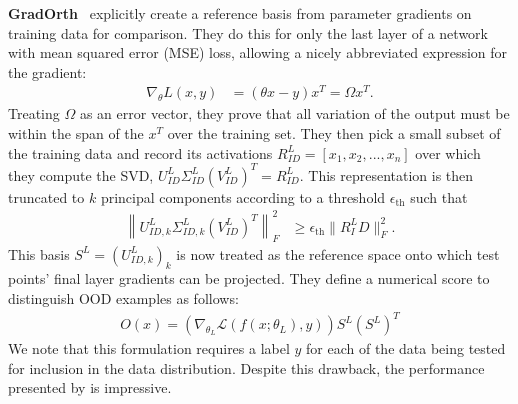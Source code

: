 \textbf{GradOrth}~\citet{behpour2023} explicitly create a reference basis from parameter gradients on training data for comparison. They do this for only the last layer of a network with mean squared error (MSE) loss, allowing a nicely abbreviated expression for the gradient:
\begin{align}
    \nabla_\theta L(x, y) &= (\theta x - y)x^T = \Omega x^T.
\end{align}
Treating $\Omega$ as an error vector, they prove that all variation of the output must be within the span of the $x^T$ over the training set. They then pick a small subset of the training data and record its activations $R^L_{ID} = [x_1, x_2, ..., x_n]$ over which they compute the SVD, $U^L_{ID} \Sigma^L_{ID} (V^L_{ID})^T = R^L_{ID}$. This representation is then truncated to $k$ principal components according to a threshold $\epsilon_{\text{th}}$ such that 
\begin{align}
\left\| U^L_{ID, k} \Sigma^L_{ID, k} (V^L_{ID})^T\right\|^2_F &\geq \epsilon_\text{th} \|R^L_ID\|^2_F.
\end{align}
This basis $S^L = (U^L_{ID, k})_k$ is now treated as the reference
space onto which test points' final layer gradients can be
projected. They define a numerical score to distinguish OOD examples
as follows: 
\begin{align}
    O(x) = (\nabla_{\theta_L} \mathcal{L}(f(x; \theta_L), y))S^L(S^L)^T
\end{align}
We note that this formulation requires a label $y$ for each of the data being tested for inclusion in the data distribution. 
Despite this drawback, the performance presented by \citet{behpour2023} is impressive.

